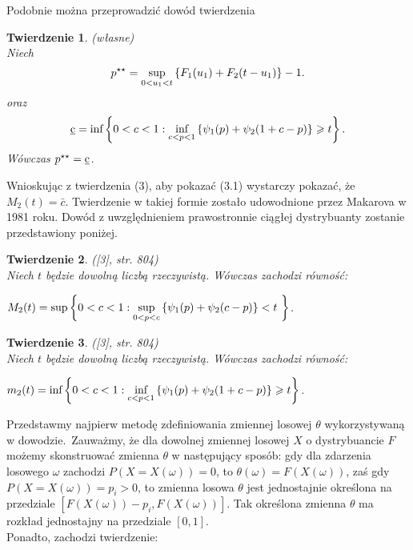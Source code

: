 \documentclass[12pt,a4paper,openany]{book}
\newtheorem{tw}{Twierdzenie}
\begin{document}
Podobnie można przeprowadzić dowód twierdzenia

\begin{tw}\textnormal{(własne)}\*\\
Niech
\begin{equation}
p^{\star\star} =  \underset{0 < u_{1} < t}{\textnormal{sup}} \left\lbrace F_{1}(u_{1}) + F_{2}(t -u_{1}) \right\rbrace -1.
\end{equation}
oraz 
\begin{equation}
\textrm{\underline{c}} = \textnormal{inf}  \left\lbrace 0<c<1: \underset{c<p<1}{\textnormal{inf}}  \left\lbrace \psi_{1}(p) + \psi_{2}(1+c-p) \right\rbrace  \geqslant t \right\rbrace.
\end{equation}
Wówczas $p^{\star\star} = \textrm{\underline{c}}$.
\end{tw}

Wnioskując z twierdzenia (3), aby pokazać (3.1) wystarczy pokazać, że $M_{2}(t) = \bar c$. Twierdzenie w takiej formie zostało udowodnione przez Makarova w 1981 roku. Dowód z uwzględnieniem prawostronnie ciągłej dystrybuanty zostanie przedstawiony poniżej.

\begin{tw}\textnormal{([3], str. 804)}\*\\
Niech $t$ będzie dowolną liczbą rzeczywistą. Wówczas zachodzi równość:\
\begin{center}
$M_{2}(t) = \textnormal{sup} \left\lbrace 0<c<1: \underset{0<p<c}{\textnormal{sup}} \left\lbrace \psi_{1}(p) + \psi_{2}(c-p) \right\rbrace <t\ \right\rbrace $.
\end{center}
\end{tw}

\begin{tw}\textnormal{([3], str. 804)}\*\\
Niech $t$ będzie dowolną liczbą rzeczywistą. Wówczas zachodzi równość:\
\begin{center}
 $m_{2}(t) = \textnormal{inf}  \left\lbrace 0<c<1: \underset{c<p<1}{\textnormal{inf}}  \left\lbrace \psi_{1}(p) + \psi_{2}(1+c-p) \right\rbrace  \geqslant t \right\rbrace $.
\end{center}
\end{tw}

Przedstawmy najpierw metodę zdefiniowania zmiennej losowej $\theta$ wykorzystywaną w dowodzie.\
Zauważmy, że dla dowolnej zmiennej losowej $X$ o dystrybuancie $F$ możemy skonstruować zmienna $\theta$ w następujący sposób: gdy dla zdarzenia losowego $\omega$ zachodzi $P(X = X(\omega)) = 0$, to $\theta(\omega) = F(X(\omega))$, zaś gdy $P(X = X(\omega)) = p_{i} > 0$, to zmienna losowa $\theta$ jest jednostajnie określona na przedziale $[F(X(\omega)) - p_{i}, F(X(\omega))]$. Tak określona zmienna $\theta$ ma rozkład jednostajny na przedziale $[0,1]$.\\
Ponadto, zachodzi twierdzenie:
\end{document}
